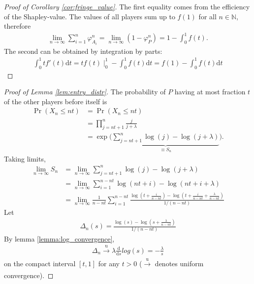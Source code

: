 \documentclass[a4paper]{article}
\newcommand{\dt}{\mathrm{d}t}
\begin{document}
\begin{proof}[Proof of Corollary \ref{cor:fringe_value}]
    The first equality comes from the efficiency of the Shapley-value.
    The values of all players sum up to $f(1)$ for all $n \in \mathbb{N}$, therefore
    \begin{align*}
        \lim_{n \to \infty} \sum_{i=1}^n \varphi_{A_i}^n = \lim_{n \to \infty} (1 - \varphi_P^n ) = 1 - \int_0^1 f(t).
    \end{align*}
    The second can be obtained by integration by parts:
    \begin{align*}
        \int_0^1 t f'(t) \dt = tf(t) \mid_0^1 - \int_0^1 f(t) \dt = f(1) - \int_0^1 f(t) \dt
    \end{align*}
\end{proof}

\begin{proof}[Proof of Lemma \ref{lem:entry_distr}] %
    The probability of $P$ having at most fraction $t$ of the other players before itself is
    \begin{align*}
        \Pr(X_n \leq nt) &= \Pr(X_n \leq nt ) \\
        &= \prod_{j = nt + 1}^n \frac{j}{j + \lambda} \\
        &= \exp \Bigg( \underbrace{\sum_{j = nt + 1}^n \log(j) - \log(j+\lambda)}_{\equiv S_n} \Bigg).
    \end{align*}
    Taking limits,
    \begin{align*}
        \lim_{n \to \infty} S_n &= \lim_{n \to \infty} \sum_{j = nt + 1}^n \log(j) - \log(j+\lambda) \\
        &= \lim_{n \to \infty} \sum_{i = 1}^{n - nt} \log(nt + i) - \log(nt + i + \lambda) \\
        &= \lim_{n \to \infty} \frac{1}{n - nt} \sum_{i = 1}^{n - nt} \frac{\log \left( t + \frac{i}{n - nt} \right) - \log \left( t + \frac{i}{n - nt} + \frac{\lambda}{n - nt} \right)}{1 / (n - nt)}
    \end{align*}
    Let
    \begin{align*}
        \Delta_n(s) = \frac{\log \left( s \right) - \log \left( s + \frac{\lambda}{n - nt} \right)}{1 / (n - nt)}
    \end{align*}
    By lemma \ref{lemma:log_convergence}, 
    \begin{align*}
        \Delta_n \xrightarrow[]{\mathrm{u}} \lambda \frac{\mathrm{d}}{\mathrm{d}s}log(s) = -\frac{\lambda}{s}
    \end{align*}
    on the compact interval $[t, 1]$ for any $t > 0$ ($\xrightarrow[]{\mathrm{u}}$ denotes uniform convergence).
    

\end{proof}
\end{document}

